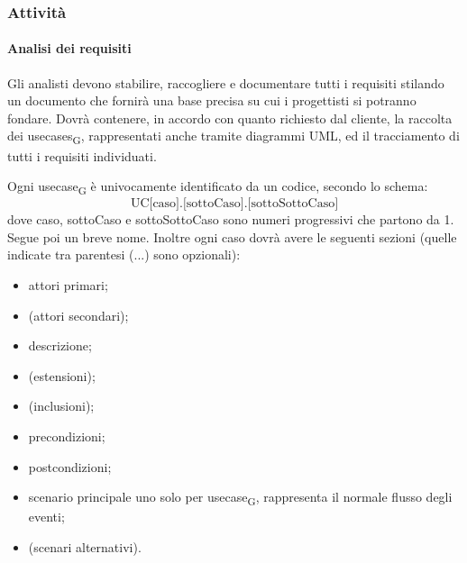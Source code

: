    \subsubsection{Attività}
        \paragraph{Analisi dei requisiti}
                Gli analisti devono stabilire, raccogliere e documentare tutti i requisiti stilando un documento che fornirà una base precisa su cui i progettisti si potranno fondare. Dovrà contenere, in accordo con quanto richiesto dal cliente, la raccolta dei \glspl{usecase}\textsubscript{G}, rappresentati anche tramite diagrammi UML, ed il tracciamento di tutti i requisiti individuati.

                Ogni \gls{usecase}\textsubscript{G} è univocamente identificato da un codice, secondo lo schema:
                $$\text{UC[caso].[sottoCaso].[sottoSottoCaso]}$$
                dove caso, sottoCaso e sottoSottoCaso sono numeri progressivi che partono da 1. Segue poi un breve nome. Inoltre ogni caso dovrà avere le seguenti sezioni (quelle indicate tra parentesi (...) sono opzionali):
                \begin{itemize}
                    \item attori primari;
                    \item (attori secondari);
                    \item descrizione;
                    \item (estensioni);
                    \item (inclusioni);
                    \item precondizioni;
                    \item postcondizioni;
                    \item scenario principale uno solo per \gls{usecase}\textsubscript{G}, rappresenta il normale flusso degli eventi;
                    \item (scenari alternativi).
                \end{itemize}

